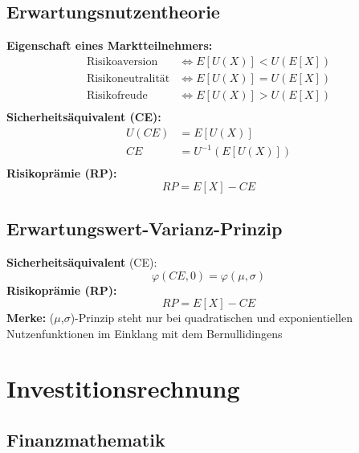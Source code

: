 \documentclass[a4paper]{scrartcl}
\begin{document}
\begin{multicols}{3}
\subsection{Erwartungsnutzentheorie}

\textbf{Eigenschaft eines Marktteilnehmers:}
\begin{equation*}
\begin{split}
     \text{Risikoaversion}    &\Leftrightarrow E[U(X)] < U(E[X]) \\
     \text{Risikoneutralität} &\Leftrightarrow E[U(X)] = U(E[X]) \\
     \text{Risikofreude}      &\Leftrightarrow E[U(X)] > U(E[X]) \\
\end{split}
\end{equation*}
\textbf{Sicherheitsäquivalent (CE):}
\begin{equation*}
\begin{split}
U(CE) &= E[U(X)]\\
   CE &= U^{-1}(E[U(X)])\\
\end{split}
\end{equation*}
\textbf{Risikoprämie (RP):}
$$RP = E[X] - CE$$

\subsection{Erwartungswert-Varianz-Prinzip}

\textbf{Sicherheitsäquivalent} (CE):
$$\varphi(CE, 0) = \varphi(\mu, \sigma) $$
\textbf{Risikoprämie (RP):}
$$RP = E[X] - CE$$
\textbf{Merke:} ($\mu$,$\sigma$)-Prinzip steht nur bei quadratischen und
exponientiellen Nutzenfunktionen im Einklang mit dem Bernullidingens

\section{Investitionsrechnung}

\subsection{Finanzmathematik}


\end{multicols}
\end{document}

